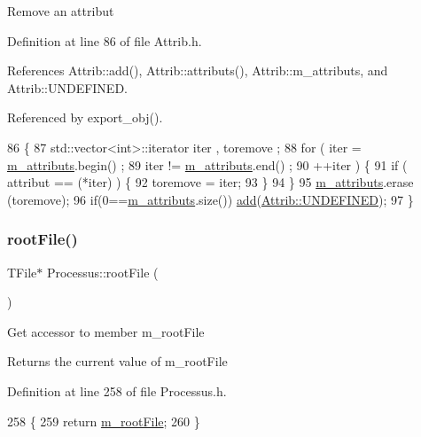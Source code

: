 Remove an attribut 

Definition at line 86 of file Attrib.\+h.



References Attrib\+::add(), Attrib\+::attributs(), Attrib\+::m\+\_\+attributs, and Attrib\+::\+U\+N\+D\+E\+F\+I\+N\+ED.



Referenced by export\+\_\+obj().


\begin{DoxyCode}
86                                \{
87     std::vector<int>::iterator iter , toremove ;
88     \textcolor{keywordflow}{for} ( iter  = \hyperlink{classAttrib_ac4bd58a0cc6b38a3b711d609a3d3aacc}{m\_attributs}.begin() ;
89           iter != \hyperlink{classAttrib_ac4bd58a0cc6b38a3b711d609a3d3aacc}{m\_attributs}.end()   ;
90           ++iter ) \{
91       \textcolor{keywordflow}{if} ( attribut == (*iter) ) \{
92         toremove = iter;
93       \}
94     \}
95     \hyperlink{classAttrib_ac4bd58a0cc6b38a3b711d609a3d3aacc}{m\_attributs}.erase (toremove);
96     \textcolor{keywordflow}{if}(0==\hyperlink{classAttrib_ac4bd58a0cc6b38a3b711d609a3d3aacc}{m\_attributs}.size()) \hyperlink{classAttrib_a235f773af19c900264a190b00a3b4ad7}{add}(\hyperlink{classAttrib_a69e171d7cc6417835a5a306d3c764235a3a8da2ab97dda18aebab196fe4100531}{Attrib::UNDEFINED});
97   \}
\end{DoxyCode}
\mbox{\label{classProcessus_a247e8c362ec08422cf53d08dd23b093c}} 
\subsubsection{\texorpdfstring{root\+File()}{rootFile()}}
{\footnotesize\ttfamily T\+File$\ast$ Processus\+::root\+File (\begin{DoxyParamCaption}{ }\end{DoxyParamCaption})\hspace{0.3cm}{\ttfamily [inline]}}

Get accessor to member m\+\_\+root\+File \begin{DoxyReturn}{Returns}
the current value of m\+\_\+root\+File 
\end{DoxyReturn}


Definition at line 258 of file Processus.\+h.


\begin{DoxyCode}
258                      \{
259     \textcolor{keywordflow}{return} \hyperlink{classProcessus_a76114f8cf2111e910c323a7ae05a015d}{m\_rootFile};
260   \}
\end{DoxyCode}
\mbox{\label{classObject_a870c5af919958c2136623b2d7816d123}} 
